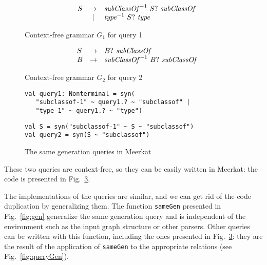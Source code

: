 \begin{figure}[h]
   \centering
   \[
\begin{array}{rlcl}
   & S &  \rightarrow & \text{\textit{subClassOf}}^{-1} \ S? \ \text{\textit{subClassOf}} \\
   &   & |            & \text{\textit{type}}^{-1} \ S? \ \text{\textit{type}} \\
\end{array}
\]
   \caption{Context-free grammar $G_1$ for query 1}
   \label{grammarQ1}
   \end{figure}

\begin{figure}[h]
   \centering
   \[
\begin{array}{rlcl}
   & S & \rightarrow & B? \ \text{\textit{subClassOf}} \\
   & B & \rightarrow & \text{\textit{subClassOf}}^{-1} \ B? \ \text{\textit{subClassOf}} \\
\end{array}
\]
   \caption{Context-free grammar $G_2$ for query 2}
   \label{grammarQ2}
   \end{figure}


\begin{figure}[h]
\begin{lstlisting}
val query1: Nonterminal = syn(
   "subclassof-1" ~ query1.? ~ "subclassof" |
   "type-1" ~ query1.? ~ "type")
\end{lstlisting}

\begin{lstlisting}
val S = syn("subclassof-1" ~ S ~ "subclassof")
val query2 = syn(S ~ "subclassof")
\end{lstlisting}
\caption{The same generation queries in Meerkat}
\label{fig:queryMeerkat}
\end{figure}

These two queries are context-free, so they can be easily written in Meerkat: the code is presented in Fig.~\ref{fig:queryMeerkat}.

The implementations of the queries are similar, and we can get rid of the code duplication by generalizing them.
The function \lstinline{sameGen} presented in Fig.~\ref{fig:gen} generalize the same generation query and is independent of the environment such as the input graph structure or other parsers.
Other queries can be written with this function, including the ones presented in Fig.~\ref{fig:queryMeerkat}: they are the result of the application of \lstinline{sameGen} to the appropriate relations (see Fig.~\ref{fig:queryGen}).

